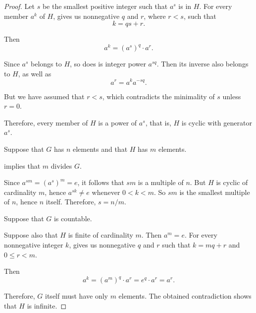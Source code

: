\begin{proof}
   Let \( s \) be the smallest positive integer such that \( a^s \) is in \( H \). For every member \( a^k \) of \( H \),  gives us nonnegative \( q \) and \( r \), where \( r < s \), such that
  \begin{equation*}
    k = qs + r.
  \end{equation*}

  Then
  \begin{equation*}
    a^k = (a^s)^q \cdot a^r.
  \end{equation*}

  Since \( a^s \) belongs to \( H \), so does is integer power \( a^{sq} \). Then its inverse also belongs to \( H \), as well as
  \begin{equation*}
    a^r = a^k a^{-sq}.
  \end{equation*}

  But we have assumed that \( r < s \), which contradicts the minimality of \( s \) unless \( r = 0 \).

  Therefore, every member of \( H \) is a power of \( a^s \), that is, \( H \) is cyclic with generator \( a^s \).

   Suppose that \( G \) has \( n \) elements and that \( H \) has \( m \) elements.

   implies that \( m \) divides \( G \).

  Since \( a^{sm} = (a^s)^m = e \), it follows that \( sm \) is a multiple of \( n \). But \( H \) is cyclic of cardinality \( m \), hence \( a^{sk} \neq e \) whenever \( 0 < k < m \). So \( sm \) is the smallest multiple of \( n \), hence \( n \) itself. Therefore, \( s = n / m \).

   Suppose that \( G \) is countable.

  Suppose also that \( H \) is finite of cardinality \( m \). Then \( a^m = e \). For every nonnegative integer \( k \),  gives us nonnegative \( q \) and \( r \) such that \( k = mq + r \) and \( 0 \leq r < m \).

  Then
  \begin{equation*}
    a^k = (a^m)^q \cdot a^r = e^q \cdot a^r = a^r.
  \end{equation*}

  Therefore, \( G \) itself must have only \( m \) elements. The obtained contradiction shows that \( H \) is infinite.
\end{proof}

